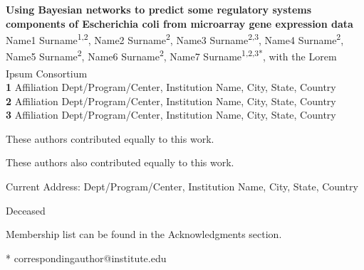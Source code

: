 \documentclass[10pt,letterpaper]{article}
\begin{document}
\vspace*{0.2in}

\begin{flushleft}
{\Large
\textbf{Using Bayesian networks to predict some regulatory systems components of Escherichia coli from microarray gene expression data} %
}
\newline
\\
Name1 Surname\textsuperscript{1,2\Yinyang},
Name2 Surname\textsuperscript{2\Yinyang},
Name3 Surname\textsuperscript{2,3\textcurrency},
Name4 Surname\textsuperscript{2},
Name5 Surname\textsuperscript{2\ddag},
Name6 Surname\textsuperscript{2\ddag},
Name7 Surname\textsuperscript{1,2,3*},
with the Lorem Ipsum Consortium\textsuperscript{\textpilcrow}
\\
\bigskip
\textbf{1} Affiliation Dept/Program/Center, Institution Name, City, State, Country
\\
\textbf{2} Affiliation Dept/Program/Center, Institution Name, City, State, Country
\\
\textbf{3} Affiliation Dept/Program/Center, Institution Name, City, State, Country
\\
\bigskip

% 
%
\Yinyang These authors contributed equally to this work.

\ddag These authors also contributed equally to this work.

\textcurrency Current Address: Dept/Program/Center, Institution Name, City, State, Country %

\dag Deceased

\textpilcrow Membership list can be found in the Acknowledgments section.

* correspondingauthor@institute.edu

\end{flushleft}
\end{document}
